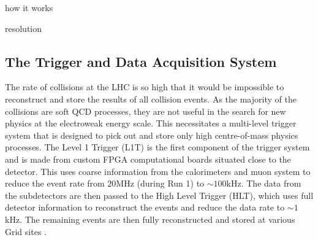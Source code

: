 how it works

resolution

\subsection{The Trigger and Data Acquisition System}
\label{sec:triggers} The rate of collisions at the LHC is so high that
it would be impossible to reconstruct and store the results of all
collision events. As the majority of the collisions are soft QCD
processes, they are not useful in the search for new physics at the
electroweak energy scale. This necessitates a multi-level trigger
system that is designed to pick out and store only high centre-of-mass
physics processes. The Level 1 Trigger (L1T) is the first component of
the trigger system and is made from custom FPGA computational boards
situated close to the detector. This uses coarse information from the
calorimeters and muon system to reduce the event rate from $20$MHz
(during Run 1) to $\sim100$kHz. The data from the subdetectors are
then passed to the High Level Trigger (HLT), which uses full detector
information to reconstruct the events and reduce the data rate to
$\sim1$kHz. The remaining events are then fully reconstructed and
stored at various Grid sites \cite{GridTechDesign}.


